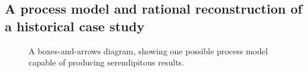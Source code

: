\subsection{A process model and rational reconstruction of a historical case study} \label{sec:ww-model}
\label{sec:modelDefinition}
\begin{figure}[h]
\begin{minipage}[b]{\textwidth}
{\centering


\par}
\smallskip
\end{minipage}
\caption{A boxes-and-arrows diagram, showing one possible process
  model capable of producing serendipitous results.}\label{fig:model}
\end{figure}

